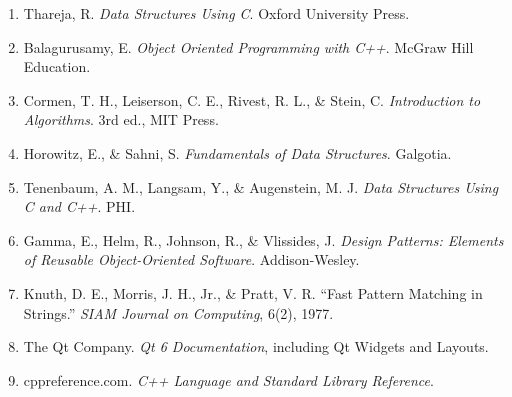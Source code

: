 \documentclass[a4paper,11pt]{article}
\begin{document}
\begin{answerbox}
\begin{enumerate}[leftmargin=19pt,itemsep=2pt,topsep=1pt]
\item Thareja, R. \textit{Data Structures Using C}. Oxford University Press.
\item Balagurusamy, E. \textit{Object Oriented Programming with C++}. McGraw Hill Education.
\item Cormen, T. H., Leiserson, C. E., Rivest, R. L., \& Stein, C. \textit{Introduction to Algorithms}. 3rd ed., MIT Press.
\item Horowitz, E., \& Sahni, S. \textit{Fundamentals of Data Structures}. Galgotia.
\item Tenenbaum, A. M., Langsam, Y., \& Augenstein, M. J. \textit{Data Structures Using C and C++}. PHI.
\item Gamma, E., Helm, R., Johnson, R., \& Vlissides, J. \textit{Design Patterns: Elements of Reusable Object-Oriented Software}. Addison-Wesley.
\item Knuth, D. E., Morris, J. H., Jr., \& Pratt, V. R. ``Fast Pattern Matching in Strings.'' \textit{SIAM Journal on Computing}, 6(2), 1977.
\item The Qt Company. \textit{Qt 6 Documentation}, including Qt Widgets and Layouts.
\item cppreference.com. \textit{C++ Language and Standard Library Reference}.
\end{enumerate}\end{answerbox}
\end{document}
